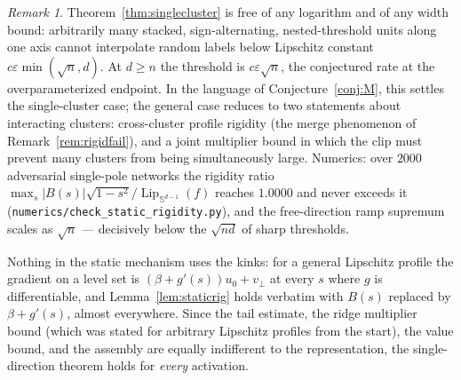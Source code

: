 \documentclass[11pt,reqno]{amsart}
\theoremstyle{plain}
\theoremstyle{definition}
\theoremstyle{remark}
\newtheorem{remark}[theorem]{Remark}
\newcommand{\Sd}{\mathbb{S}^{d-1}}
\newcommand{\eps}{\varepsilon}
\newcommand{\Lip}{\operatorname{Lip}}
\begin{document}
\begin{remark}
Theorem~\ref{thm:singlecluster} is free of any logarithm and of any width bound: arbitrarily many stacked, sign-alternating, nested-threshold units along one axis cannot interpolate random labels below Lipschitz constant $c\eps\min(\sqrt n,d)$. At $d\ge n$ the threshold is $c\eps\sqrt n$, the conjectured rate at the overparameterized endpoint. In the language of Conjecture~\ref{conj:M}, this settles the single-cluster case; the general case reduces to two statements about interacting clusters: cross-cluster profile rigidity (the merge phenomenon of Remark~\ref{rem:rigidfail}), and a joint multiplier bound in which the clip must prevent many clusters from being simultaneously large. Numerics: over $2000$ adversarial single-pole networks the rigidity ratio $\max_s|B(s)|\sqrt{1-s^2}/\Lip_{\Sd}(f)$ reaches $1.0000$ and never exceeds it (\texttt{numerics/check\_static\_rigidity.py}), and the free-direction ramp supremum scales as $\sqrt n$ --- decisively below the $\sqrt{nd}$ of sharp thresholds.
\end{remark}

Nothing in the static mechanism uses the kinks: for a general Lipschitz profile the gradient on a level set is $(\beta+g'(s))u_0+v_\perp$ at every $s$ where $g$ is differentiable, and Lemma~\ref{lem:staticrig} holds verbatim with $B(s)$ replaced by $\beta+g'(s)$, almost everywhere. Since the tail estimate, the ridge multiplier bound (which was stated for arbitrary Lipschitz profiles from the start), the value bound, and the assembly are equally indifferent to the representation, the single-direction theorem holds for \emph{every} activation.
\end{document}
